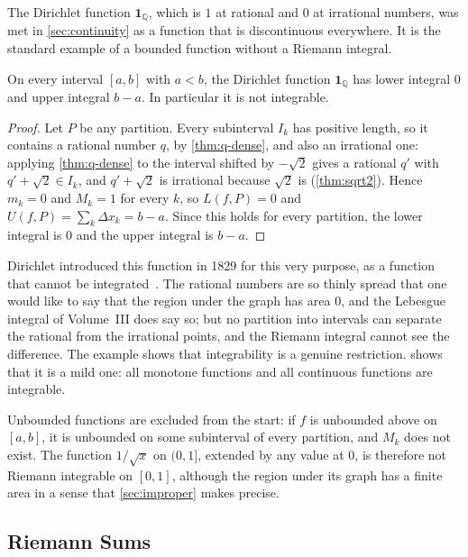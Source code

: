 The Dirichlet function $\mathbf 1_{\mathbb Q}$, which is $1$ at rational and $0$ at irrational numbers, was met in \cref{sec:continuity} as a function that is discontinuous everywhere. It is the standard example of a bounded function without a Riemann integral.

\begin{proposition}
\label{prop:dirichlet}
On every interval $[a,b]$ with $a<b$, the Dirichlet function $\mathbf 1_{\mathbb Q}$ has lower integral $0$ and upper integral $b-a$. In particular it is not integrable.
\end{proposition}

\begin{proof}
Let $P$ be any partition. Every subinterval $I_k$ has positive length, so it contains a rational number $q$, by \cref{thm:q-dense}, and also an irrational one: applying \cref{thm:q-dense} to the interval shifted by $-\sqrt2$ gives a rational $q'$ with $q'+\sqrt2\in I_k$, and $q'+\sqrt2$ is irrational because $\sqrt2$ is (\cref{thm:sqrt2}). Hence $m_k=0$ and $M_k=1$ for every $k$, so $L(f,P)=0$ and $U(f,P)=\sum_k\Delta x_k=b-a$. Since this holds for every partition, the lower integral is $0$ and the upper integral is $b-a$.
\end{proof}

Dirichlet introduced this function in 1829 for this very purpose, as a function that cannot be integrated~\cite{dirichlet1829}. The rational numbers are so thinly spread that one would like to say that the region under the graph has area $0$, and the Lebesgue integral of Volume~III does say so; but no partition into intervals can separate the rational from the irrational points, and the Riemann integral cannot see the difference. The example shows that integrability is a genuine restriction.  shows that it is a mild one: all monotone functions and all continuous functions are integrable.

Unbounded functions are excluded from the start: if $f$ is unbounded above on $[a,b]$, it is unbounded on some subinterval of every partition, and $M_k$ does not exist. The function $1/\sqrt x$ on $(0,1]$, extended by any value at $0$, is therefore not Riemann integrable on $[0,1]$, although the region under its graph has a finite area in a sense that \cref{sec:improper} makes precise.

\subsection{Riemann Sums}

